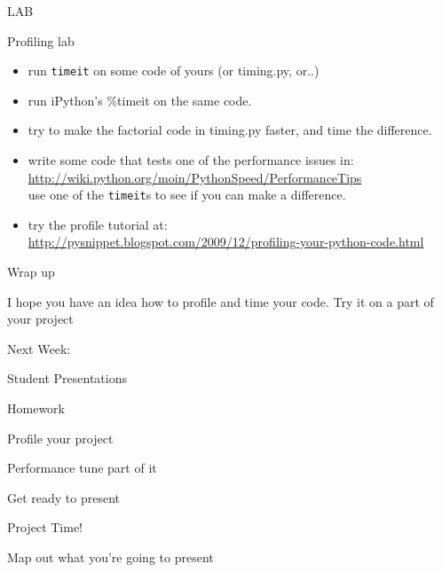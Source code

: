 \documentclass{beamer}
\begin{document}
\begin{frame}[fragile]{LAB}

{\Large Profiling lab}
\begin{itemize}
  \item run \verb|timeit| on some code of yours (or timing.py, or..)
  \item run iPython's \%timeit on the same code.
  \item try to make the factorial code in timing.py faster, and time the difference.
  \item write some code that tests one of the performance issues in:\\
        {\small \url{http://wiki.python.org/moin/PythonSpeed/PerformanceTips} }\\
        use one of the \verb|timeit|s to see if you can make a difference.
  \item try the profile tutorial at:\\
        {\small \url{http://pysnippet.blogspot.com/2009/12/profiling-your-python-code.html} }
\end{itemize}

\end{frame}


\begin{frame}[fragile]{Wrap up}

\vfill
{\Large I hope you have an idea how to profile and time your code.}
\vfill
{\Large Try it on a part of your project}
\vfill

\end{frame}

\begin{frame}{Next Week:}

\vfill
{\LARGE Student Presentations}


\vfill

\end{frame}

\begin{frame}[fragile]{Homework}

\vfill
\Large{Profile your project}

\vfill
\Large{Performance tune part of it}

\vfill
\Large{Get ready to present}

\vfill

\end{frame}

\begin{frame}[fragile]{Project Time!}

\vfill
\Large{Map out what you're going to present}
\vfill

\end{frame}
\end{document}

